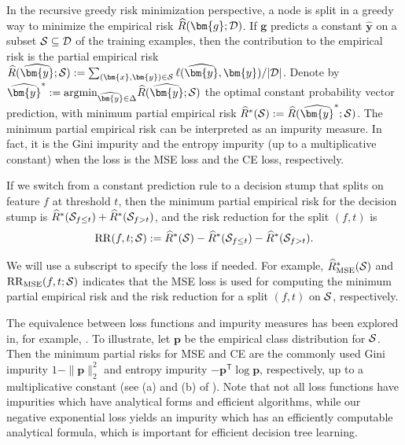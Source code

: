 \documentclass[letterpaper]{article} %
\newcommand{\bx}{{\bm{x}}}
\newcommand{\bp}{{\bm{p}}}
\newcommand{\bg}{{\bm{g}}}
\newcommand{\by}{{\bm{y}}}
\newcommand{\T}{{\mathsf{T}}}
\newcommand{\cS}{{\cal{S}}}
\newcommand{\cD}{{\cal{D}}}
\newcommand{\simplex}{\Delta}
\newcommand{\argmin}{\mathrm{argmin}}
\newcommand{\RR}{{\rm RR}}
\begin{document}
In the recursive greedy risk minimization perspective, a node is split in a greedy way to minimize 
the empirical risk $\widehat{R}(\bg;\cD)$. 
If $\bg$ predicts a constant $\widehat{\by}$ on a subset $\cS\subseteq \cD$ of the training examples, then the contribution to the empirical risk is the partial empirical risk 
$\widehat{R}(\widehat{\by};\cS):=\sum_{(\bx,\by)\in\cS}  \ell(\widehat{\by},\by)/|\cD|$. 
Denote by 
$\widehat{\by}^*:=\argmin_{\widehat{\by}\in\simplex}\widehat{R}(\widehat{\by};\cS)$ the optimal constant probability vector prediction, with minimum partial empirical risk $\widehat{R}^*(\cS):=\widehat{R}(\widehat{\by}^*;\cS)$. 
The minimum partial empirical risk can be interpreted as an impurity measure.
In fact, it is the Gini impurity and the entropy impurity (up
to a multiplicative constant) when the loss is the MSE loss and the CE loss,
respectively.

If we switch from a constant prediction rule to a decision stump that splits on feature $f$ at threshold $t$, then the minimum partial empirical risk for the decision stump is $\widehat{R}^*(\cS_{f\leq t})+\widehat{R}^*(\cS_{f> t})$, and the risk reduction for the split $(f,t)$ is 
\begin{equation}
    \RR(f,t;\cS) := \widehat{R}^*(\cS) - \widehat{R}^*(\cS_{f\leq t}) - \widehat{R}^*(\cS_{f> t}).
\end{equation}

We will use a subscript to specify the loss if needed. 
For example, $\widehat{R}_{\mathrm{MSE}}^*(\cS)$ and
$\RR_{\mathrm{MSE}}(f,t;\cS)$ indicates that the MSE loss is used for computing
the minimum partial empirical risk and the risk reduction for a split $(f, t)$
on $\cS$, respectively.

The equivalence between loss functions and impurity measures has been explored
in, for example, 
\cite{yang2019robust, wilton2022positive}.
To illustrate, let $\bp$ be the empirical class distribution for $\cS$. 
Then the minimum partial risks for MSE and CE are the commonly used Gini
impurity $1-\|\bp\|_2^2$ and entropy impurity $-\bp^\T\log \bp$, respectively, up
to a multiplicative constant (see (a) and (b) of ). 
Note that not all loss functions have impurities which have analytical forms and
efficient algorithms, while our negative exponential loss yields an 
impurity which has an efficiently computable analytical formula, which is 
important for efficient decision tree learning.
\end{document}
